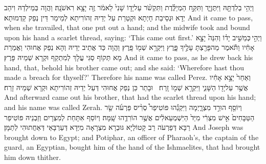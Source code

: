 {וַיְהִ֥י בְלִדְתָּ֖הּ וַיִּתֶּן\maqqaf יָ֑ד וַתִּקַּ֣ח הַמְיַלֶּ֗דֶת וַתִּקְשֹׁ֨ר עַל\maqqaf יָד֤וֹ שָׁנִי֙ לֵאמֹ֔ר זֶ֖ה יָצָ֥א רִאשֹׁנָֽה׃}
{וַהֲוָה בְּמֵילְדַהּ וִיהַב יְדָא וּנְסֵיבַת חָיְתָא וּקְטַרַת עַל יְדֵיהּ זְהוֹרִיתָא לְמֵימַר דֵּין נְפַק קַדְמוּתָא׃}
{And it came to pass, when she travailed, that one put out a hand; and the midwife took and bound upon his hand a scarlet thread, saying: ‘This came out first.’}{}
{וַיְהִ֣י \legarmeh  כְּמֵשִׁ֣יב יָד֗וֹ וְהִנֵּה֙ יָצָ֣א אָחִ֔יו וַתֹּ֕אמֶר מַה\maqqaf פָּרַ֖צְתָּ עָלֶ֣יךָ פָּ֑רֶץ וַיִּקְרָ֥א שְׁמ֖וֹ פָּֽרֶץ׃}
{וַהֲוָה כַּד אֲתֵיב יְדֵיהּ וְהָא נְפַק אֲחוּהִי וַאֲמַרַת מָא תְּקוֹף סַגִּי עֲלָךְ לְמִתְקַף וּקְרָא שְׁמֵיהּ פָּרֶץ׃}
{And it came to pass, as he drew back his hand, that, behold his brother came out; and she said: ‘Wherefore hast thou made a breach for thyself?’ Therefore his name was called Perez.}{}
{וְאַחַר֙ יָצָ֣א אָחִ֔יו אֲשֶׁ֥ר עַל\maqqaf יָד֖וֹ הַשָּׁנִ֑י וַיִּקְרָ֥א שְׁמ֖וֹ זָֽרַח׃ \setuma }
{וּבָתַר כֵּן נְפַק אֲחוּהִי דְּעַל יְדֵיהּ זְהוֹרִיתָא וּקְרָא שְׁמֵיהּ זָרַח׃}
{And afterward came out his brother, that had the scarlet thread upon his hand; and his name was called Zerah.}{}
\newperek
\newseder
{}%
{וְיוֹסֵ֖ף הוּרַ֣ד מִצְרָ֑יְמָה וַיִּקְנֵ֡הוּ פּוֹטִיפַר֩ סְרִ֨יס פַּרְעֹ֜ה שַׂ֤ר הַטַּבָּחִים֙ אִ֣ישׁ מִצְרִ֔י מִיַּד֙ הַיִּשְׁמְעֵאלִ֔ים אֲשֶׁ֥ר הוֹרִדֻ֖הוּ שָֽׁמָּה׃}
{וְיוֹסֵף אִתָּחַת לְמִצְרָיִם וְזַבְנֵיהּ פּוֹטִיפַר רַבָּא דְּפַרְעֹה רַב קָטוֹלַיָּא גּוּבְרָא מִצְרָאָה מִיְּדָא דְּעַרְבָּאֵי דְּאַחֲתוּהִי לְתַמָּן׃}
{And Joseph was brought down to Egypt; and Potiphar, an officer of Pharaoh’s, the captain of the guard, an Egyptian, bought him of the hand of the Ishmaelites, that had brought him down thither.}{}
